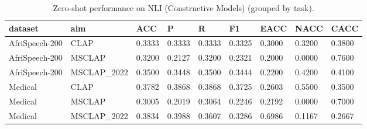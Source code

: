 \begin{table}
\caption{Zero-shot performance on NLI (Constructive Models) (grouped by task).}
\label{tab:nli_constructive_models_results}
\begin{tabular}{lllllllll}
\toprule
dataset & alm & ACC & P & R & F1 & EACC & NACC & CACC \\
\midrule
AfriSpeech-200 & CLAP & 0.3333 & 0.3333 & 0.3333 & 0.3325 & 0.3000 & 0.3200 & 0.3800 \\
AfriSpeech-200 & MSCLAP & 0.3200 & 0.2127 & 0.3200 & 0.2321 & 0.2000 & 0.0000 & 0.7600 \\
AfriSpeech-200 & MSCLAP\_2022 & 0.3500 & 0.3448 & 0.3500 & 0.3444 & 0.2200 & 0.4200 & 0.4100 \\
Medical & CLAP & 0.3782 & 0.3868 & 0.3868 & 0.3725 & 0.2603 & 0.5500 & 0.3500 \\
Medical & MSCLAP & 0.3005 & 0.2019 & 0.3064 & 0.2246 & 0.2192 & 0.0000 & 0.7000 \\
Medical & MSCLAP\_2022 & 0.3834 & 0.3988 & 0.3607 & 0.3286 & 0.6986 & 0.1167 & 0.2667 \\
\bottomrule
\end{tabular}
\end{table}
